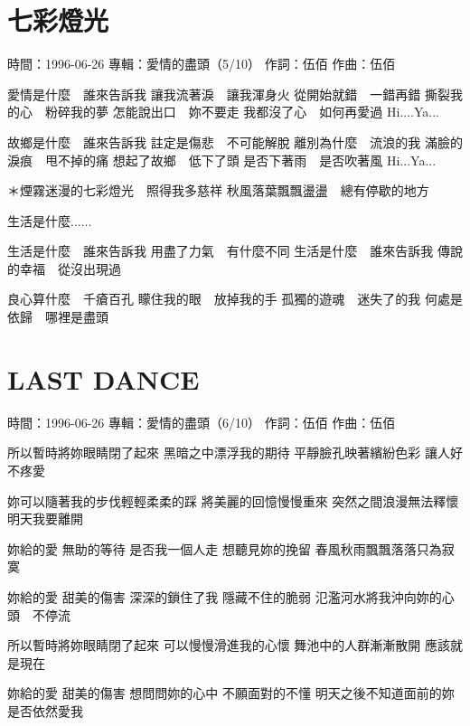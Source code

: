 \documentclass[UTF8,a4paper,oneside,twocolumn,12pt]{ctexbook}
\newcommand{\infopair}[2]{\textbullet #1：#2}
\newcommand{\zc}[1][伍佰]{\infopair{作詞}{#1}}
\newcommand{\zq}[1][伍佰]{\infopair{作曲}{#1}}
\newcommand{\zj}[1]{\infopair{專輯}{#1}}
\newcommand{\sj}[1]{\infopair{時間}{#1}}
\newenvironment{info}{\begin{flushleft}\kaishu
	}
	{\end{flushleft}\normalsize\yahei\par}
\newenvironment{lyric}{
	}
{}
\begin{document}
\section{七彩燈光}
\begin{info}
	\sj{1996-06-26}
	\zj{愛情的盡頭（5/10）}
	\zc
	\zq
\end{info}
\begin{lyric}
	愛情是什麼　誰來告訴我
	讓我流著淚　讓我渾身火
	從開始就錯　一錯再錯
	撕裂我的心　粉碎我的夢
	怎能說出口　妳不要走
	我都沒了心　如何再愛過
	Hi....Ya...

	故鄉是什麼　誰來告訴我
	註定是傷悲　不可能解脫
	離別為什麼　流浪的我
	滿臉的淚痕　甩不掉的痛
	想起了故鄉　低下了頭
	是否下著雨　是否吹著風
	Hi...Ya...

	＊煙霧迷漫的七彩燈光　照得我多慈祥
	秋風落葉飄飄盪盪　總有停歇的地方

	生活是什麼......

	生活是什麼　誰來告訴我
	用盡了力氣　有什麼不同
	生活是什麼　誰來告訴我
	傳說的幸福　從沒出現過

	良心算什麼　千瘡百孔
	矇住我的眼　放掉我的手
	孤獨的遊魂　迷失了的我
	何處是依歸　哪裡是盡頭
\end{lyric}

\section{LAST DANCE}
\begin{info}
	\sj{1996-06-26}
	\zj{愛情的盡頭（6/10）}
	\zc
	\zq
\end{info}
\begin{lyric}
	所以暫時將妳眼睛閉了起來
	黑暗之中漂浮我的期待
	平靜臉孔映著繽紛色彩
	讓人好不疼愛

	妳可以隨著我的步伐輕輕柔柔的踩
	將美麗的回憶慢慢重來
	突然之間浪漫無法釋懷
	明天我要離開

	妳給的愛
	無助的等待
	是否我一個人走
	想聽見妳的挽留
	春風秋雨飄飄落落只為寂寞

	妳給的愛
	甜美的傷害
	深深的鎖住了我
	隱藏不住的脆弱
	氾濫河水將我沖向妳的心頭　不停流

	所以暫時將妳眼睛閉了起來
	可以慢慢滑進我的心懷
	舞池中的人群漸漸散開
	應該就是現在

	妳給的愛
	甜美的傷害
	想問問妳的心中
	不願面對的不懂
	明天之後不知道面前的妳是否依然愛我
\end{lyric}
\end{document}
